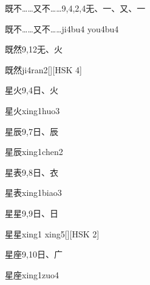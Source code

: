 \begin{entry}{既不……又不……}{9,4,2,4}{⽆、⼀、⼜、⼀}
  \begin{phonetics}{既不……又不……}{ji4bu4 you4bu4}
  \end{phonetics}
\end{entry}

\begin{entry}{既然}{9,12}{⽆、⽕}
  \begin{phonetics}{既然}{ji4ran2}[][HSK 4]
  \end{phonetics}
\end{entry}

\begin{entry}{星火}{9,4}{⽇、⽕}
  \begin{phonetics}{星火}{xing1huo3}
  \end{phonetics}
\end{entry}

\begin{entry}{星辰}{9,7}{⽇、⾠}
  \begin{phonetics}{星辰}{xing1chen2}
  \end{phonetics}
\end{entry}

\begin{entry}{星表}{9,8}{⽇、⾐}
  \begin{phonetics}{星表}{xing1biao3}
  \end{phonetics}
\end{entry}

\begin{entry}{星星}{9,9}{⽇、⽇}
  \begin{phonetics}{星星}{xing1 xing5}[][HSK 2]
  \end{phonetics}
\end{entry}

\begin{entry}{星座}{9,10}{⽇、⼴}
  \begin{phonetics}{星座}{xing1zuo4}
  \end{phonetics}
\end{entry}

